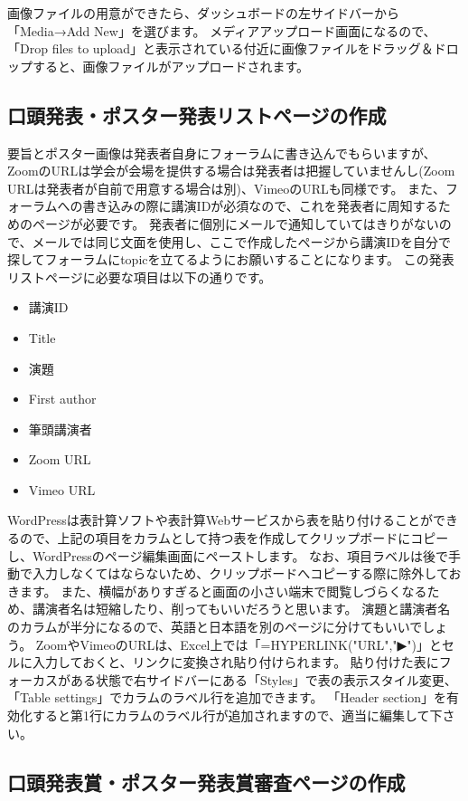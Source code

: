 \documentclass[titlepage,10pt,a4paper,uplatex]{jsbook}
\begin{document}
画像ファイルの用意ができたら、ダッシュボードの左サイドバーから「Media→Add New」を選びます。
メディアアップロード画面になるので、「Drop files to upload」と表示されている付近に画像ファイルをドラッグ＆ドロップすると、画像ファイルがアップロードされます。

\subsection{口頭発表・ポスター発表リストページの作成}

要旨とポスター画像は発表者自身にフォーラムに書き込んでもらいますが、ZoomのURLは学会が会場を提供する場合は発表者は把握していませんし(Zoom URLは発表者が自前で用意する場合は別)、VimeoのURLも同様です。
また、フォーラムへの書き込みの際に講演IDが必須なので、これを発表者に周知するためのページが必要です。
発表者に個別にメールで通知していてはきりがないので、メールでは同じ文面を使用し、ここで作成したページから講演IDを自分で探してフォーラムにtopicを立てるようにお願いすることになります。
この発表リストページに必要な項目は以下の通りです。

\begin{itemize}
\item 講演ID
\item Title
\item 演題
\item First author
\item 筆頭講演者
\item Zoom URL
\item Vimeo URL
\end{itemize}

WordPressは表計算ソフトや表計算Webサービスから表を貼り付けることができるので、上記の項目をカラムとして持つ表を作成してクリップボードにコピーし、WordPressのページ編集画面にペーストします。
なお、項目ラベルは後で手動で入力しなくてはならないため、クリップボードへコピーする際に除外しておきます。
また、横幅がありすぎると画面の小さい端末で閲覧しづらくなるため、講演者名は短縮したり、削ってもいいだろうと思います。
演題と講演者名のカラムが半分になるので、英語と日本語を別のページに分けてもいいでしょう。
ZoomやVimeoのURLは、Excel上では「=HYPERLINK("URL","▶")」とセルに入力しておくと、リンクに変換され貼り付けられます。
貼り付けた表にフォーカスがある状態で右サイドバーにある「Styles」で表の表示スタイル変更、「Table settings」でカラムのラベル行を追加できます。
「Header section」を有効化すると第1行にカラムのラベル行が追加されますので、適当に編集して下さい。

\subsection{口頭発表賞・ポスター発表賞審査ページの作成}
\end{document}

